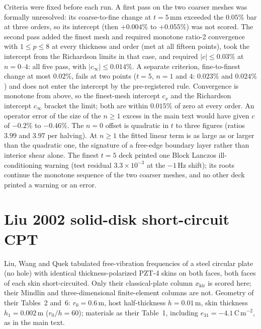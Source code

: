 \documentclass[11pt]{article}
\begin{document}
Criteria were fixed before each run. A first pass on the two coarser
meshes was formally unresolved: its coarse-to-fine change at
$t=5\,\mathrm{mm}$ exceeded the $0.05\%$ bar at three orders, so its
intercept (then $+0.004\%$ to $+0.055\%$) was not scored. The second
pass added the finest mesh and required monotone ratio-2 convergence
with $1\le p\le8$ at every thickness and order (met at all fifteen
points), took the intercept from the Richardson limits in that case, and
required $|c|\le0.03\%$ at $n=0$--$4$: all five pass, with
$|c_\infty|\le0.014\%$. A separate criterion, fine-to-finest change at most
$0.02\%$, fails at two points ($t=5$, $n=1$ and $4$: $0.023\%$ and $0.024\%$) and does
not enter the intercept by the pre-registered rule. Convergence is
monotone from above, so the finest-mesh intercept $c_x$ and the
Richardson intercept $c_\infty$ bracket the limit; both are within
$0.015\%$ of zero at every order. An operator error of the size of the
$n\ge1$ excess in the main text would have given $c$ of $-0.2\%$ to
$-0.46\%$. The $n=0$ offset is quadratic in $t$ to three figures (ratios
$3.99$ and $3.97$ per halving). At $n\ge1$ the fitted linear term is as
large as or larger than the quadratic one, the signature of a free-edge
boundary layer rather than interior shear alone. The finest $t=5$ deck
printed one Block Lanczos ill-conditioning warning (test residual
$3.3\times10^{-3}$ at the $-1\,\mathrm{Hz}$ shift); its roots continue
the monotone sequence of the two coarser meshes, and no other deck
printed a warning or an error.


\section{Liu 2002 solid-disk short-circuit CPT}
\label{sec:liu-disk}

Liu, Wang and Quek \cite{liu2002} tabulated free-vibration frequencies of
a steel circular plate (no hole) with identical thickness-polarized PZT-4
skins on both faces, both faces of each skin short-circuited. Only their
classical-plate column $x_{\mathrm{kir}}$ is scored here; their Mindlin
and three-dimensional finite-element columns are not. Geometry of their
Tables~2 and~6: $r_0=0.6\,\mathrm{m}$, host half-thickness
$h=0.01\,\mathrm{m}$, skin thickness $h_1=0.002\,\mathrm{m}$
($r_0/h=60$); materials as their Table~1, including
$e_{31}=-4.1\,\mathrm{C\,m^{-2}}$, as in the main text.
\end{document}
